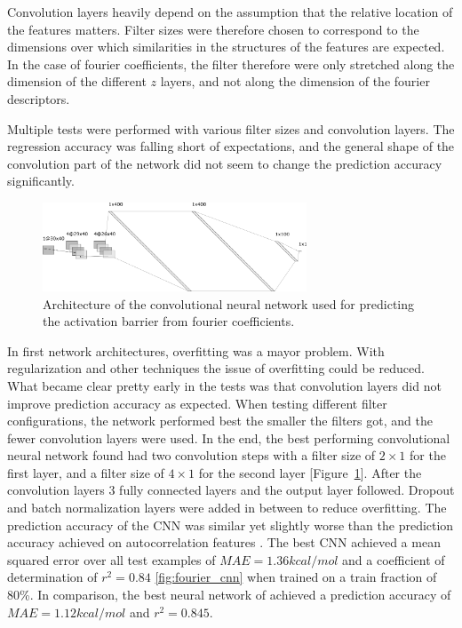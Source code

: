 Convolution layers heavily depend on the assumption that the relative location of the features matters.
Filter sizes were therefore chosen to correspond to the dimensions over which similarities in the structures of the features are expected.
In the case of fourier coefficients, the filter therefore were only stretched along the dimension of the different $z$ layers, and not along the dimension of the fourier descriptors.

Multiple tests were performed with various filter sizes and convolution layers.
The regression accuracy was falling short of expectations, and the general shape of the convolution part of the network did not seem to change the prediction accuracy significantly.

\begin{figure} [h]
    \centering
    \includegraphics[width=0.7\textwidth]{figures/regression/fourier/cnn/fourier_conv_layout.png} 
    \caption[Layout of LEFD CNN]{
        Architecture of the convolutional neural network used for predicting the activation barrier from fourier coefficients.
    }
    \label{fig:cnn-architecture}
\end{figure}

In first network architectures, overfitting was a mayor problem.
With regularization and other techniques the issue of overfitting could be reduced.
What became clear pretty early in the tests was that convolution layers did not improve prediction accuracy as expected.
When testing different filter configurations, the network performed best the smaller the filters got, and the fewer convolution layers were used.
In the end, the best performing convolutional neural network found had two convolution steps with a filter size of $2 \times 1$ for the first layer, and a filter size
of $4 \times 1$ for the second layer [Figure~\ref{fig:cnn-architecture}].
After the convolution layers 3 fully connected layers and the output layer followed.
Dropout and batch normalization layers were added in between to reduce overfitting.
The prediction accuracy of the CNN was similar yet slightly worse than the prediction accuracy achieved on autocorrelation features \cite{friederich_dos}.
The best CNN achieved a mean squared error over all test examples of $MAE=1.36 kcal/mol$ and a coefficient of determination of $r^2=0.84$ \ref{fig:fourier_cnn} when trained on a train fraction of 80\%.
In comparison, the best neural network of \cite{friederich_dos} achieved a prediction accuracy of $MAE=1.12 kcal/mol$ and $r^2=0.845$.

